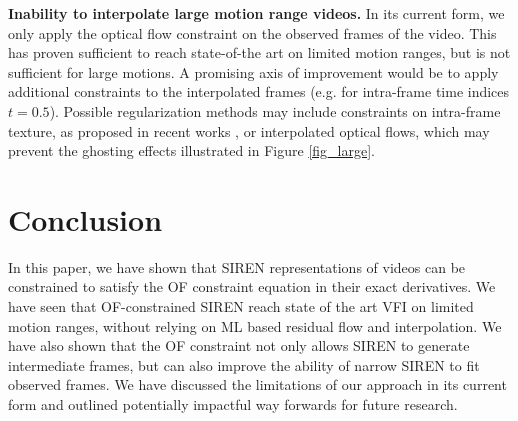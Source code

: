 \documentclass{article}
\begin{document}
\textbf{Inability to interpolate large motion range videos.}
In its current form, we only apply the optical flow constraint on the observed frames of the video.
This has proven sufficient to reach state-of-the art on limited motion ranges, but is not sufficient for large motions.
A promising axis of improvement would be to apply additional constraints to the interpolated frames
(e.g. for intra-frame time indices $t=0.5$).
Possible regularization methods may include constraints on intra-frame texture, as proposed in recent works \cite{reda2022film},
or interpolated optical flows, which may prevent the ghosting effects illustrated in Figure \ref{fig_large}.

\section{Conclusion}
\label{sec_conc}

In this paper, we have shown that SIREN representations of videos
can be constrained to satisfy the OF constraint equation in their exact derivatives.
We have seen that OF-constrained SIREN reach state of the art VFI on limited motion ranges,
without relying on ML based residual flow and interpolation.
We have also shown that the OF constraint not only allows SIREN to generate intermediate frames,
but can also improve the ability of narrow SIREN to fit observed frames.
We have discussed the limitations of our approach in its current form and outlined
potentially impactful way forwards for future research.



\end{document}
